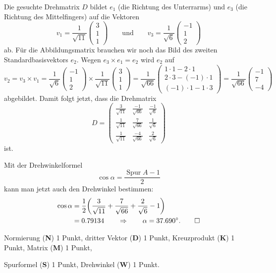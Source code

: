 \begin{loesung}
\begin{teilaufgaben}
\item
Die gesuchte Drehmatrix $D$ bildet $e_1$ (die Richtung des Unterrarms)
und $e_3$ (die Richtung des Mittelfingers) auf die Vektoren
\[
v_1
=
\frac{1}{\sqrt{11}}
\begin{pmatrix}
3\\1\\1
\end{pmatrix}
\qquad\text{und}\qquad
v_3
=
\frac{1}{\sqrt{6}}
\begin{pmatrix}
-1\\1\\2
\end{pmatrix}
\]
ab.
Für die Abbildungsmatrix brauchen wir noch das Bild des zweiten
Standardbasisvektors $e_2$.
Wegen $e_3\times e_1=e_2$ wird $e_2$ auf 
\[
v_2
=
v_3\times v_1
=
\frac{1}{\sqrt{6}}
\begin{pmatrix}
-1\\1\\2
\end{pmatrix}
\times
\frac{1}{\sqrt{11}}
\begin{pmatrix}
3\\1\\1
\end{pmatrix}
=
\frac{1}{\sqrt{66}}
\begin{pmatrix}
1\cdot 1-2\cdot 1\\
2\cdot 3-(-1)\cdot 1\\
(-1)\cdot 1-1\cdot 3
\end{pmatrix}
=
\frac{1}{\sqrt{66}}
\begin{pmatrix}
-1\\7\\-4
\end{pmatrix}
\]
abgebildet.
Damit folgt jetzt, dass die Drehmatrix
\[
D=
\begin{pmatrix}
\frac{3}{\sqrt{11}}&\frac{-1}{\sqrt{66}}&\frac{-1}{\sqrt{6}}\\
\frac{1}{\sqrt{11}}&\frac{ 7}{\sqrt{66}}&\frac{ 1}{\sqrt{6}}\\
\frac{1}{\sqrt{11}}&\frac{-4}{\sqrt{66}}&\frac{ 2}{\sqrt{6}}
\end{pmatrix}
\]
ist.
\item
Mit der Drehwinkelformel
\[
\cos\alpha = \frac{\operatorname{Spur}A-1}2
\]
kann man jetzt auch den Drehwinkel bestimmen:
\begin{align*}
\cos\alpha
&=
\frac12\biggl(
\frac{3}{\sqrt{11}}+\frac{7}{\sqrt{66}}+\frac{2}{\sqrt{6}}
-1\biggr)
\\
&=0.79134
\qquad\Rightarrow\qquad
\alpha =
37.690^\circ.
\qedhere
\end{align*}
\end{teilaufgaben}
\end{loesung}

\begin{bewertung}
\begin{teilaufgaben}
\item
Normierung ({\bf N}) 1 Punkt,
dritter Vektor ({\bf D}) 1 Punkt,
Kreuzprodukt ({\bf K}) 1 Punkt,
Matrix ({\bf M}) 1 Punkt,
\item
Spurformel ({\bf S}) 1 Punkt,
Drehwinkel ({\bf W}) 1 Punkt.
\end{teilaufgaben}
\end{bewertung}





